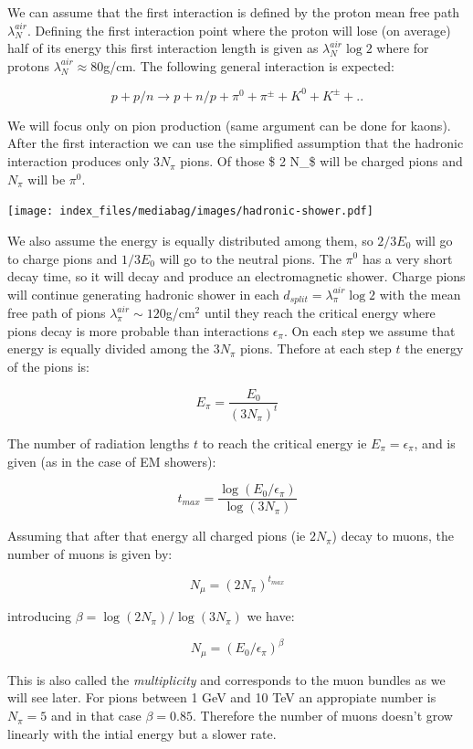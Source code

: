 \documentclass[
  letterpaper,
  DIV=11,
  numbers=noendperiod]{scrreprt}
\begin{document}
We can assume that the first interaction is defined by the proton mean
free path \(\lambda^{air}_N\). Defining the first interaction point
where the proton will lose (on average) half of its energy this first
interaction length is given as \(\lambda^{air}_{N} \log 2\) where for
protons \(\lambda^{air}_N \approx 80\)g/cm. The following general
interaction is expected:

\[ p + p/n \rightarrow p + n/p + \pi^0 + \pi^{\pm} + K^0 + K^{\pm} + .. \]

We will focus only on pion production (same argument can be done for
kaons). After the first interaction we can use the simplified assumption
that the hadronic interaction produces only \(3N_\pi\) pions. Of those
\$ 2 N\_\pi\$ will be charged pions and \(N_\pi\) will be \(\pi^0\).

\begin{center}
\texttt{[image: index\_files/mediabag/images/hadronic-shower.pdf]}
\end{center}

We also assume the energy is equally distributed among them, so
\(2/3E_0\) will go to charge pions and \(1/3E_0\) will go to the neutral
pions. The \(\pi^0\) has a very short decay time, so it will decay and
produce an electromagnetic shower. Charge pions will continue generating
hadronic shower in each \(d_{split} = \lambda_{\pi}^{air} \log 2\) with
the mean free path of pions \(\lambda_\pi^{air} \sim 120\)g/cm\(^2\)
until they reach the critical energy where pions decay is more probable
than interactions \(\epsilon_\pi\). On each step we assume that energy
is equally divided among the \(3 N_\pi\) pions. Thefore at each step
\(t\) the energy of the pions is:

\[E_\pi = \frac{E_0}{(3N_\pi)^t} \]

The number of radiation lengths \(t\) to reach the critical energy ie
\(E_\pi = \epsilon_\pi\), and is given (as in the case of EM showers):

\[t_{max} = \frac{\log(E_0/\epsilon_\pi)}{\log(3N_\pi)}\]

Assuming that after that energy all charged pions (ie \(2N_\pi\)) decay
to muons, the number of muons is given by:

\[N_\mu =(2N_\pi)^{t_{max}}\]

introducing \(\beta = \log(2N_\pi)/\log(3N_\pi)\) we have:

\[N_\mu =(E_0/\epsilon_\pi)^\beta \]

This is also called the \emph{multiplicity} and corresponds to the muon
bundles as we will see later. For pions between 1 GeV and 10 TeV an
appropiate number is \(N_\pi = 5\) and in that case \(\beta = 0.85\).
Therefore the number of muons doesn't grow linearly with the intial
energy but a slower rate.
\end{document}
